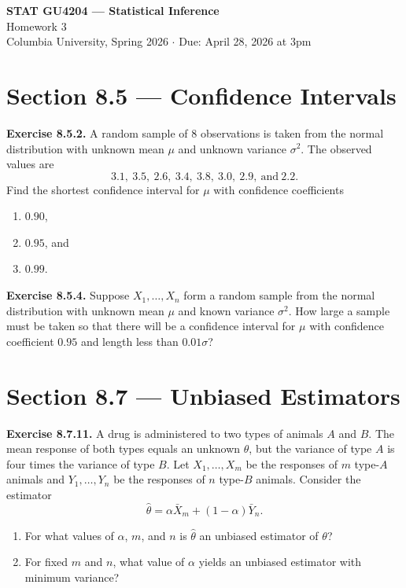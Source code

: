 \documentclass[11pt]{article}
\begin{document}
\begin{center}
    {\large\textbf{STAT GU4204 --- Statistical Inference}}\\[2pt]
    {\normalsize Homework 3}\\[2pt]
    {\small Columbia University, Spring 2026 \quad $\cdot$ \quad Due: April 28, 2026 at 3pm}
\end{center}

\vspace{1em}

\section*{Section 8.5 --- Confidence Intervals}

\textbf{Exercise 8.5.2.} A random sample of 8 observations is taken from the normal distribution with unknown mean $\mu$ and unknown variance $\sigma^2$. The observed values are
\[
3.1,\ 3.5,\ 2.6,\ 3.4,\ 3.8,\ 3.0,\ 2.9,\ \text{and}\ 2.2.
\]
Find the shortest confidence interval for $\mu$ with confidence coefficients
\begin{enumerate}
    \item[(a)] $0.90$,
    \item[(b)] $0.95$, and
    \item[(c)] $0.99$.
\end{enumerate}

\vspace{0.5em}

\textbf{Exercise 8.5.4.} Suppose $X_1, \dots, X_n$ form a random sample from the normal distribution with unknown mean $\mu$ and known variance $\sigma^2$. How large a sample must be taken so that there will be a confidence interval for $\mu$ with confidence coefficient $0.95$ and length less than $0.01\sigma$?

\section*{Section 8.7 --- Unbiased Estimators}

\textbf{Exercise 8.7.11.} A drug is administered to two types of animals $A$ and $B$. The mean response of both types equals an unknown $\theta$, but the variance of type $A$ is four times the variance of type $B$. Let $X_1, \dots, X_m$ be the responses of $m$ type-$A$ animals and $Y_1, \dots, Y_n$ be the responses of $n$ type-$B$ animals. Consider the estimator
\[
\hat{\theta} = \alpha \bar{X}_m + (1 - \alpha) \bar{Y}_n.
\]
\begin{enumerate}
    \item[(a)] For what values of $\alpha$, $m$, and $n$ is $\hat{\theta}$ an unbiased estimator of $\theta$?
    \item[(b)] For fixed $m$ and $n$, what value of $\alpha$ yields an unbiased estimator with minimum variance?
\end{enumerate}
\end{document}
